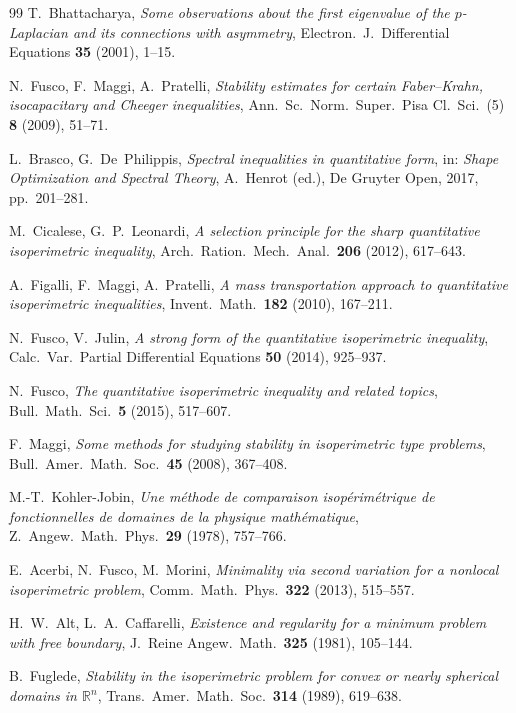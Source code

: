 \documentclass[11pt]{article}
\theoremstyle{definition}
\begin{document}
\begin{thebibliography}{99}
 T.~Bhattacharya,
\emph{Some observations about the first eigenvalue of the
$p$-Laplacian and its connections with asymmetry},
Electron.\ J.\ Differential Equations \textbf{35} (2001), 1--15.

 N.~Fusco, F.~Maggi, A.~Pratelli,
\emph{Stability estimates for certain Faber--Krahn, isocapacitary and
Cheeger inequalities},
Ann.\ Sc.\ Norm.\ Super.\ Pisa Cl.\ Sci.\ (5) \textbf{8} (2009),
51--71.

 L.~Brasco, G.~De~Philippis,
\emph{Spectral inequalities in quantitative form}, in:
\emph{Shape Optimization and Spectral Theory}, A.~Henrot (ed.),
De Gruyter Open, 2017, pp.~201--281.

 M.~Cicalese, G.~P.~Leonardi,
\emph{A selection principle for the sharp quantitative isoperimetric
inequality}, Arch.\ Ration.\ Mech.\ Anal.\ \textbf{206} (2012),
617--643.

 A.~Figalli, F.~Maggi, A.~Pratelli,
\emph{A mass transportation approach to quantitative isoperimetric
inequalities}, Invent.\ Math.\ \textbf{182} (2010), 167--211.

 N.~Fusco, V.~Julin,
\emph{A strong form of the quantitative isoperimetric inequality},
Calc.\ Var.\ Partial Differential Equations \textbf{50} (2014),
925--937.

 N.~Fusco,
\emph{The quantitative isoperimetric inequality and related topics},
Bull.\ Math.\ Sci.\ \textbf{5} (2015), 517--607.

 F.~Maggi,
\emph{Some methods for studying stability in isoperimetric type
problems}, Bull.\ Amer.\ Math.\ Soc.\ \textbf{45} (2008), 367--408.

 M.-T.~Kohler-Jobin,
\emph{Une m\'ethode de comparaison isop\'erim\'etrique de
fonctionnelles de domaines de la physique math\'ematique},
Z.\ Angew.\ Math.\ Phys.\ \textbf{29} (1978), 757--766.

 E.~Acerbi, N.~Fusco, M.~Morini,
\emph{Minimality via second variation for a nonlocal isoperimetric
problem}, Comm.\ Math.\ Phys.\ \textbf{322} (2013), 515--557.

 H.~W.~Alt, L.~A.~Caffarelli,
\emph{Existence and regularity for a minimum problem with free
boundary}, J.\ Reine Angew.\ Math.\ \textbf{325} (1981), 105--144.

 B.~Fuglede,
\emph{Stability in the isoperimetric problem for convex or nearly
spherical domains in $\mathbb R^n$},
Trans.\ Amer.\ Math.\ Soc.\ \textbf{314} (1989), 619--638.


\end{thebibliography}
\end{document}
